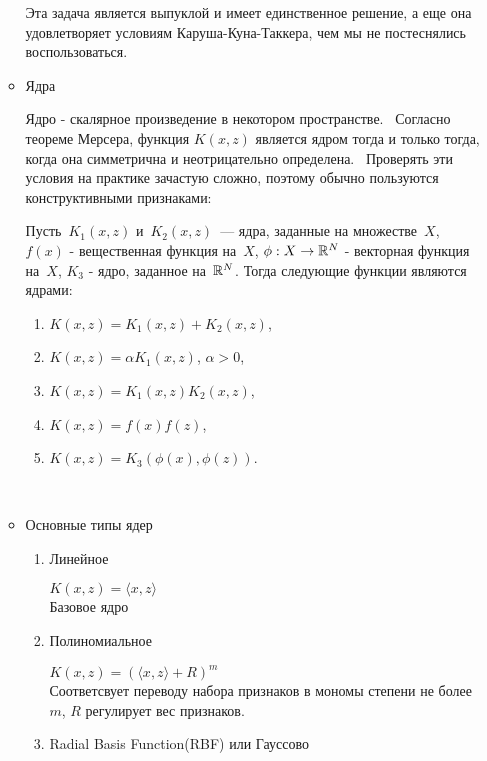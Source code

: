 \begin{enumerate}
\begin{itemize}
                Эта задача является выпуклой и имеет единственное решение, а еще она удовлетворяет условиям Каруша-Куна-Таккера, чем мы не постеснялись воспользоваться.
            \item Ядра \
            
                Ядро - скалярное произведение в некотором пространстве. \
                Согласно теореме Мерсера, функция $K(x, z)$ является ядром тогда и только тогда, когда она симметрична и неотрицательно определена. \ 
                Проверять эти условия на практике зачастую сложно, поэтому обычно пользуются конструктивными признаками: 
                
                \begin{theorem}
                \label{th:kernelConstr}
                    Пусть~$K_1(x, z)$ и~$K_2(x, z)$~--- ядра, заданные на множестве~$X$,
                    $f(x)$ -  вещественная функция на~$X$,
                    $\phi: X \to \mathbb{R}^N$ -  векторная функция на~$X$,
                    $K_3$ - ядро, заданное на~$\mathbb{R}^N$.
                    Тогда следующие функции являются ядрами:
                    \begin{enumerate}
                        \item $K(x, z) = K_1(x, z) + K_2(x, z)$,
                        \item $K(x, z) = \alpha K_1(x, z)$, $\alpha > 0$,
                        \item $K(x, z) = K_1(x, z) K_2(x, z)$,
                        \item $K(x, z) = f(x) f(z)$,
                        \item $K(x, z) = K_3(\phi(x), \phi(z))$.
                    \end{enumerate}
                \end{theorem} \
                 \
                
            \item Основные типы ядер
            \begin{enumerate}
                \item Линейное \ 
                
                    $K(x, z) = \langle x, z \rangle$ \\
                    Базовое ядро
                \item Полиномиальное \
                
                $K(x, z) = (\langle x, z \rangle + R)^m$ \\
                Соответсвует переводу набора признаков в мономы степени не более $m$, $R$ регулирует вес признаков.
                \item Radial Basis Function(RBF) или Гауссово \
                    

\end{enumerate}
\end{itemize}
\end{enumerate}

